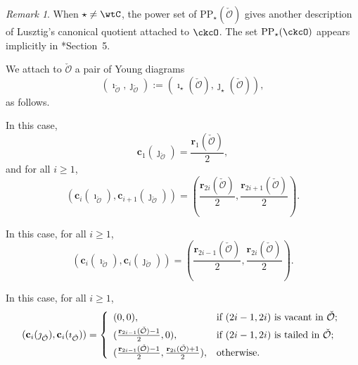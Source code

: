 \documentclass[12pt]{amsart}
\newcommand{\CO}{{\mathcal {O}}}
\newcommand{\be}{\begin {equation}}
\newcommand{\ee}{\end {equation}}
\numberwithin{equation}{section}
\theoremstyle{remark}
\newtheorem{remark}[thm]{Remark}
\def\CPP{\mathrm{PP}}
\begin{document}
\begin{remark} When $\star\neq \wtC$, %
the power set of $\CPP_\star(\check \CO)$ gives another description of Lusztig's canonical
  quotient attached to $\ckcO$. The set $\CPP_{\star}(\ckcO)$ appears implicitly in
\cite{So}*{Section~5}.
\end{remark}


We attach to $\check \CO$ a pair of Young diagrams
\be\label{ijo}
  (\imath_{\check \CO}, \jmath_{\check \CO}):=(\imath_\star(\check \CO), \jmath_\star(\check \CO)),
\ee
as follows.

\medskip

 In this case,
\[
  \mathbf c_{1}(\jmath_{\check \CO})=\frac{\mathbf r_1(\check \CO)}{2},
\]
and for all $i\geq 1$,
\[
  \left (\mathbf c_{i}(\imath_{\check \CO}), \mathbf c_{i+1}(\jmath_{\check \CO})\right )= \left (\frac{\mathbf r_{2i}(\check \CO)}{2}, \frac{\mathbf r_{2i+1}(\check \CO)}{2}\right ).
\]

\medskip

 In
this case, for all $i\geq 1$,
\[
  (\mathbf c_{i}(\imath_{\check \CO}), \mathbf c_{i}(\jmath_{\check \CO}))= \left (\frac{\mathbf r_{2i-1}(\check \CO)}{2}, \frac{\mathbf r_{2i}(\check \CO)}{2}\right).
\]

\medskip

 In this case, for all
$i\geq 1$,
\[
  (\mathbf c_{i}(\jmath_{\check \CO}), \mathbf c_{i}(\imath_{\check \CO}))= \left\{
    \begin{array}{ll}
      (0,  0), &\hbox{if $(2i-1, 2i)$ is vacant  in $\check \CO$};\smallskip\\
      (\frac{\mathbf r_{2i-1}(\check \CO)-1}{2},  0), & \hbox{if $(2i-1, 2i)$ is tailed in $\check \CO$};\smallskip\\
      (\frac{\mathbf r_{2i-1}(\check \CO)-1}{2},  \frac{\mathbf r_{2i}(\check \CO)+1}{2}), &\hbox{otherwise}.\\
    \end{array}
  \right.
\]
\medskip
\end{document}
